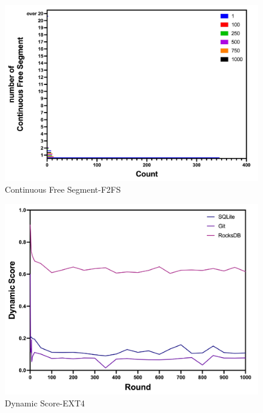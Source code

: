 \begin{figure}[t]
    \centering
	\includegraphics[width=0.95\columnwidth]{graphs/continuous_free_segment_fsfs}
	\caption{Continuous Free Segment-F2FS}
	\label{f:continuous_free_segment_fsfs}
\end{figure}

\begin{figure}[t]
    \centering
	\includegraphics[width=0.95\columnwidth]{graphs/ext4_dynamic}
	\caption{Dynamic Score-EXT4}
	\label{f:ext4_dynamic}
\end{figure}


